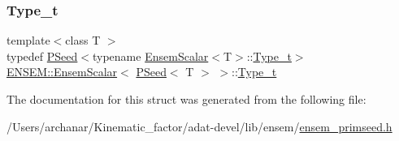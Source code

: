 \subsubsection{\texorpdfstring{Type\_t}{Type\_t}\hspace{0.1cm}{\footnotesize\ttfamily [3/3]}}
{\footnotesize\ttfamily template$<$class T $>$ \\
typedef \mbox{\hyperlink{classENSEM_1_1PSeed}{P\+Seed}}$<$typename \mbox{\hyperlink{structENSEM_1_1EnsemScalar}{Ensem\+Scalar}}$<$T$>$\+::\mbox{\hyperlink{structENSEM_1_1EnsemScalar_3_01PSeed_3_01T_01_4_01_4_abb7f97324ea0068fcbf50343784cd95c}{Type\+\_\+t}}$>$ \mbox{\hyperlink{structENSEM_1_1EnsemScalar}{E\+N\+S\+E\+M\+::\+Ensem\+Scalar}}$<$ \mbox{\hyperlink{classENSEM_1_1PSeed}{P\+Seed}}$<$ T $>$ $>$\+::\mbox{\hyperlink{structENSEM_1_1EnsemScalar_3_01PSeed_3_01T_01_4_01_4_abb7f97324ea0068fcbf50343784cd95c}{Type\+\_\+t}}}



The documentation for this struct was generated from the following file\+:\begin{DoxyCompactItemize}
\item 
/\+Users/archanar/\+Kinematic\+\_\+factor/adat-\/devel/lib/ensem/\mbox{\hyperlink{adat-devel_2lib_2ensem_2ensem__primseed_8h}{ensem\+\_\+primseed.\+h}}\end{DoxyCompactItemize}
